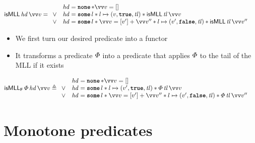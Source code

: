\documentclass[thesis.tex]{subfiles}
\begin{document}
\begin{align*}
    \textlog{isMLL}\, \langv{hd}\, \vect{\val} & =
    \begin{array}{cl}
             & \langv{hd} = \None * \vect{\val} = []                                                                                                                \\
        \lor & \langv{hd} = \Some l * l \fmapsto (\val, \True, \langv{tl}) * \textlog{isMLL}\, \langv{tl}\, \vect{\val}                                             \\
        \lor & \langv{hd} = \Some l * \vect{\val} = [\val'] + \vect{\val}'' * l \fmapsto (\val', \False, \langv{tl}) * \textlog{isMLL}\, \langv{tl}\, \vect{\val}''
    \end{array}
\end{align*}
\begin{itemize}
    \item We first turn our desired predicate into a functor
    \item It transforms a predicate $\varPhi$ into a predicate that applies $\varPhi$ to the tail of the MLL if it exists 
\end{itemize}

\begin{align*}
    \isMLL_\hopred\, \pred\, \langv{hd}\, \vect{v} & \eqdef
    \begin{array}{rl}
             & \langv{hd} = \None * \vect{v} = []                                                                                                         \\
        \lor & \langv{hd} = \Some l * l \fmapsto (\val', \True, \langv{tl}) * \pred\, \langv{tl}\, \vect{v}                                               \\
        \lor & \langv{hd} = \Some l * \vect{\val} = [\val'] + \vect{\val}'' * l \fmapsto (\val', \False, \langv{tl}) * \pred\, \langv{tl}\, \vect{\val}''
    \end{array}
\end{align*}

\section{Monotone predicates}
\label{sec:monotone}
\end{document}
